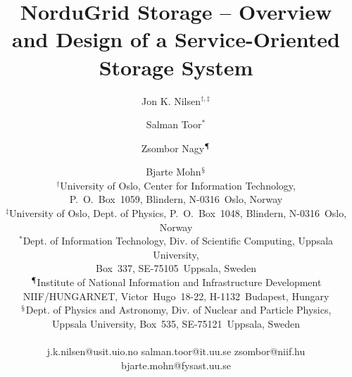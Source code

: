 \documentclass[final]{ieee}
\begin{document}
\pagestyle{headings} 
\title{NorduGrid Storage -- Overview and Design of a Service-Oriented Storage System}
\author{  Jon K. Nilsen$^{\dagger,\ddagger}$ \and Salman Toor$^{*}$
  \and Zsombor Nagy$^{\mathparagraph}$ \and Bjarte Mohn$^{\mathsection}$ 
 \\ $^{\dagger}$University of Oslo, Center for Information Technology,\\
P.~O.~Box~1059, Blindern, N-0316~Oslo, Norway
  \\ $^{\ddagger}$University of Oslo, Dept. of Physics, P.~O.~Box~1048,
Blindern, N-0316~Oslo, Norway
\\$^{*}$Dept. of Information Technology, Div. of Scientific Computing, Uppsala
University,\\ Box~337, SE-75105~Uppsala, Sweden\\
$^{\mathparagraph}$Institute of National Information and Infrastructure
Development\\ NIIF/HUNGARNET, Victor~Hugo~18-22, H-1132~Budapest, Hungary 
  \\  $^{\mathsection}$Dept. of Physics and Astronomy, Div. of Nuclear and
Particle Physics,\\ Uppsala University, Box~535, SE-75121~Uppsala, Sweden \\ \\
j.k.nilsen@usit.uio.no \hspace{5 mm}
  salman.toor@it.uu.se \hspace{5 mm} zsombor@niif.hu \\  \hspace{7 mm}
  bjarte.mohn@fysast.uu.se}
  
\end{document}
